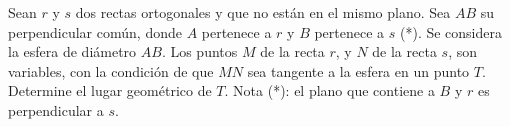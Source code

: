 Sean $r$ y $s$ dos rectas ortogonales y que no están en el mismo plano.
Sea $AB$ su perpendicular común, donde $A$ pertenece a $r$ y $B$ pertenece a $s$ (*).
Se considera la esfera de diámetro $AB$. Los puntos $M$ de la recta $r$, y $N$ de la recta $s$, son variables, con la condición de que $MN$ sea tangente a la esfera en un punto $T$.
Determine el lugar geométrico de $T$. \newline 
Nota (*): el plano que contiene a $B$ y $r$ es perpendicular a $s$. 
